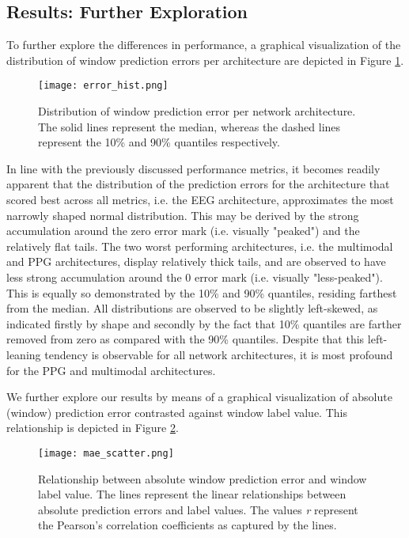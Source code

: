 \documentclass[fleqn,11pt]{paper}
\begin{document}
\subsection{Results: Further Exploration}
To further explore the differences in performance, a graphical visualization of the distribution of window prediction errors per architecture are depicted in Figure \ref{fig:mae_hist}.

\vspace{7mm}
\begin{figure}[h]
\centering
\texttt{[image: error\_hist.png]}
\vspace{2mm}
\caption{Distribution of window prediction error per network architecture. The solid lines represent the median, whereas the dashed lines represent the 10\% and 90\% quantiles respectively. } \label{fig:mae_hist}
\end{figure}
\vspace{4mm}

In line with the previously discussed performance metrics, it becomes readily apparent that the distribution of the prediction errors for the architecture that scored best across all metrics, i.e. the EEG architecture, approximates the most narrowly shaped normal distribution. This may be derived by the strong accumulation around the zero error mark (i.e. visually "peaked") and the relatively flat tails. The two worst performing architectures, i.e. the multimodal and PPG architectures, display relatively thick tails, and are observed to have less strong accumulation around the 0 error mark (i.e. visually "less-peaked"). This is equally so demonstrated by the 10\% and 90\% quantiles, residing farthest from the median.  All distributions are observed to be slightly left-skewed, as indicated firstly by shape and secondly by the fact that 10\% quantiles are farther removed from zero as compared with the 90\% quantiles. Despite that this left-leaning tendency is observable for all network architectures, it is most profound for the PPG and multimodal architectures. 

We further explore our results by means of a graphical visualization of absolute (window) prediction error contrasted against window label value. This relationship is depicted in Figure \ref{fig:mae_scatter}.

\begin{figure}[h]
\centering
\texttt{[image: mae\_scatter.png]}
\caption{Relationship between absolute window prediction error and window label value. The lines represent the linear relationships between absolute prediction errors and label values. The values \textit{r} represent the Pearson's correlation coefficients as captured by the lines.} \label{fig:mae_scatter}
\end{figure}
\vspace{7mm}
\end{document}
